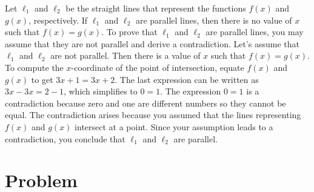 \documentclass[a4paper,oneside,12pt]{article}
\begin{document}
\begin{solution}
Let $\ell_1$ and $\ell_2$ be the straight lines that represent the
functions $f(x)$ and $g(x)$, respectively.  If $\ell_1$ and $\ell_2$
are parallel lines, then there is no value of $x$ such that
$f(x) = g(x)$.  To prove that $\ell_1$ and $\ell_2$ are parallel
lines, you may assume that they are not parallel and derive a
contradiction.  Let's assume that $\ell_1$ and $\ell_2$ are not
parallel.  Then there is a value of $x$ such that $f(x) = g(x)$.  To
compute the $x$-coordinate of the point of intersection, equate $f(x)$
and $g(x)$ to get $3x + 1 = 3x + 2$.  The last expression can be
written as $3x - 3x = 2 - 1$, which simplifies to $0 = 1$.  The
expression $0 = 1$ is a contradiction because zero and one are
different numbers so they cannot be equal.  The contradiction arises
because you assumed that the lines representing $f(x)$ and $g(x)$
intersect at a point.  Since your assumption leads to a contradiction,
you conclude that $\ell_1$ and $\ell_2$ are parallel.
\end{solution}



\section*{Problem}
\end{document}
